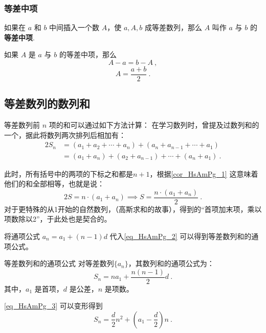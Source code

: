 \subsubsection{等差中项}

如果在 $a$ 和 $b$ 中间插入一个数 $A$，使 $a,A,b$ 成等差数列，那么 $A$ 叫作 $a$ 与 $b$ 的\textbf{等差中项}.

如果 $A$ 是 $a$ 与 $b$ 的等差中项，那么
\begin{equation}
A - a = b - A~,
\end{equation}
\begin{equation}
A = \frac{a+b}{2}~.
\end{equation}


\subsection{等差数列的数列和}

等差数列前 $n$ 项的和可以通过如下方法计算：  
在学习数列时，曾提及过数列和的一个，据此将数列两次排列后相加有：
\begin{equation}
\begin{split}
2S_n &= (a_1 + a_2 + \cdots + a_n)+(a_n + a_{n-1} + \cdots + a_1)\\
&=(a_1+a_{n})+(a_2+a_{n-1}) +\cdots +(a_n+a_1)~.
\end{split}
\end{equation}

此时，所有括号中的两项的下标之和都是$n+1$，根据\autoref{cor_HsAmPg_1} 这意味着他们的和全部相等，也就是说：
\begin{equation}\label{eq_HsAmPg_2}
2S = n \cdot (a_1+a_n)\implies S = \frac{n\cdot(a_1+a_n)}{2}~.
\end{equation}
对于更特殊的从1开始的自然数列，（高斯求和的故事），得到的“首项加末项，乘以项数除以2”，于此处也是契合的。

将通项公式 $a_n = a_1 + (n-1)d$ 代入\autoref{eq_HsAmPg_2} 可以得到等差数列和的通项公式。
\begin{corollary}{等差数列和的通项公式}
对等差数列$\{a_n\}$，其数列和的通项公式为：
\begin{equation}\label{eq_HsAmPg_3}
S_n = na_1+\frac{n(n-1)}{2}d~.
\end{equation}
其中，$a_1$ 是首项，$d$ 是公差，$n$ 是项数。
\end{corollary}

\autoref{eq_HsAmPg_3} 可以变形得到
\begin{equation}
S_n = \frac{d}{2}n^2+\left(a_1-\frac{d}{2}\right)n~.
\end{equation}


